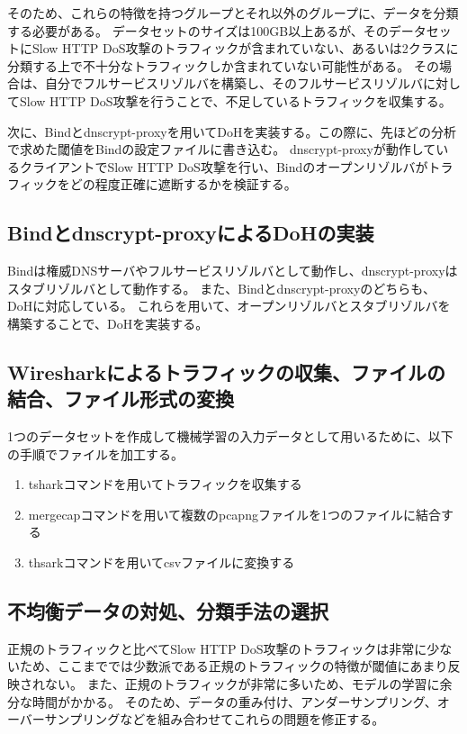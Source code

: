 \documentclass[twocolumn,article]{jlreq}
\begin{document}
そのため、これらの特徴を持つグループとそれ以外のグループに、データを分類する必要がある。%
データセットのサイズは100GB以上あるが、そのデータセットにSlow HTTP DoS攻撃のトラフィックが含まれていない、あるいは2クラスに分類する上で不十分なトラフィックしか含まれていない可能性がある。%
その場合は、自分でフルサービスリゾルバを構築し、そのフルサービスリゾルバに対してSlow HTTP DoS攻撃を行うことで、不足しているトラフィックを収集する。

次に、Bindとdnscrypt-proxyを用いてDoHを実装する。この際に、先ほどの分析で求めた閾値をBindの設定ファイルに書き込む。
dnscrypt-proxyが動作しているクライアントでSlow HTTP DoS攻撃を行い、Bindのオープンリゾルバがトラフィックをどの程度正確に遮断するかを検証する。

\subsection{Bindとdnscrypt-proxyによるDoHの実装}
Bindは権威DNSサーバやフルサービスリゾルバとして動作し、dnscrypt-proxyはスタブリゾルバとして動作する。%
また、Bindとdnscrypt-proxyのどちらも、DoHに対応している。%
これらを用いて、オープンリゾルバとスタブリゾルバを構築することで、DoHを実装する。

\subsection{Wiresharkによるトラフィックの収集、ファイルの結合、ファイル形式の変換}
1つのデータセットを作成して機械学習の入力データとして用いるために、以下の手順でファイルを加工する。

\begin{enumerate}
  \item tsharkコマンドを用いてトラフィックを収集する
  \item mergecapコマンドを用いて複数のpcapngファイルを1つのファイルに結合する
  \item thsarkコマンドを用いてcsvファイルに変換する
\end{enumerate}

\subsection{不均衡データの対処、分類手法の選択}
正規のトラフィックと比べてSlow HTTP DoS攻撃のトラフィックは非常に少ないため、ここまででは少数派である正規のトラフィックの特徴が閾値にあまり反映されない。
また、正規のトラフィックが非常に多いため、モデルの学習に余分な時間がかかる。
そのため、データの重み付け、アンダーサンプリング、オーバーサンプリングなどを組み合わせてこれらの問題を修正する。%
\end{document}

